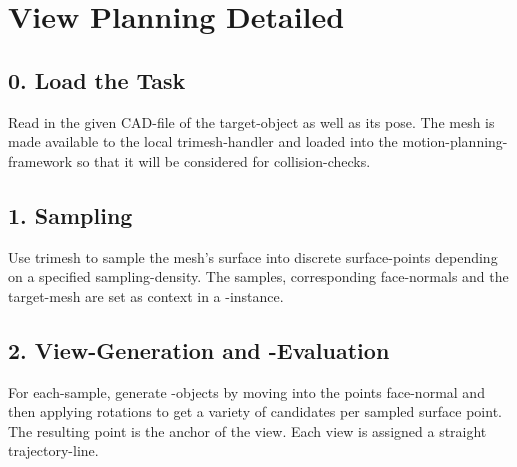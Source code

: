 \documentclass[letterpaper,10pt,english]{sphinxmanual}
\begin{document}
\chapter{View Planning Detailed}
\label{\detokenize{view_planning_detailed::doc}}\label{\detokenize{view_planning_detailed:view-planning-detailed}}\label{\detokenize{view_planning_detailed:id1}}

\section{0. Load the Task}
\label{\detokenize{view_planning_detailed:load-the-task}}
Read in the given CAD-file of the target-object as well as its pose. The mesh is made available to the local trimesh-handler and loaded into the motion-planning-framework
 so that it will be considered for collision-checks.

\begin{figure}[htbp]
\centering

\noindent{}
\end{figure}


\section{1. Sampling}
\label{\detokenize{view_planning_detailed:sampling}}
Use trimesh to sample the mesh’s surface into discrete surface-points depending on a specified sampling-density. The samples, corresponding face-normals and the target-mesh are
set as context in a {\hyperref[\detokenize{module_sensor_model:sensor-model}]{}}-instance.

\begin{figure}[htbp]
\centering

\noindent{}
\end{figure}


\section{2. View-Generation and -Evaluation}
\label{\detokenize{view_planning_detailed:view-generation-and-evaluation}}
For each-sample, generate {\hyperref[\detokenize{module_view:view}]{}}-objects by moving into the points face-normal and then applying rotations to get a variety of candidates per sampled surface point.
The resulting point is the anchor of the view. Each view is assigned a straight trajectory-line.
\end{document}
